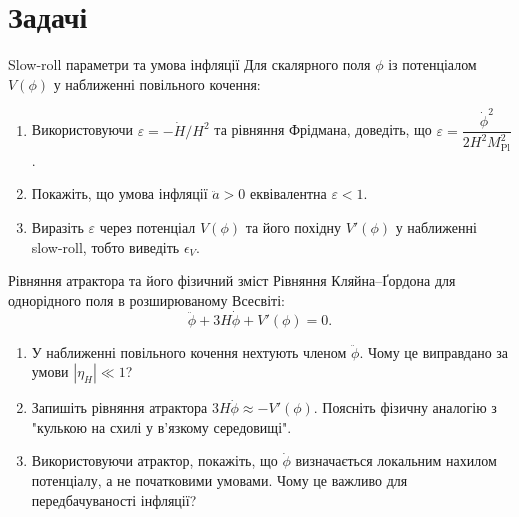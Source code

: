 \section*{Задачі}



\begin{problem}{Slow-roll параметри та умова інфляції}
Для скалярного поля $\phi$ із потенціалом $V(\phi)$ у наближенні повільного кочення:

\begin{enumerate}
    \item Використовуючи $\varepsilon = -\dot{H}/H^2$ та рівняння Фрідмана,
          доведіть, що $\varepsilon = \dfrac{\dot{\phi}^2}{2H^2 M_{\mathrm{Pl}}^2}$.
    \item Покажіть, що умова інфляції $\ddot{a} > 0$ еквівалентна $\varepsilon < 1$.
    \item Виразіть $\varepsilon$ через потенціал $V(\phi)$ та його похідну $V'(\phi)$
          у наближенні slow-roll, тобто виведіть $\epsilon_V$.
\end{enumerate}
\end{problem}


\begin{problem}{Рівняння атрактора та його фізичний зміст}
Рівняння Кляйна--Ґордона для однорідного поля в розширюваному Всесвіті:
\[
\ddot{\phi} + 3H\dot{\phi} + V'(\phi) = 0.
\]

\begin{enumerate}
    \item У наближенні повільного кочення нехтують членом $\ddot{\phi}$.
          Чому це виправдано за умови $|\eta_H| \ll 1$?
    \item Запишіть рівняння атрактора $3H\dot{\phi} \approx -V'(\phi)$.
          Поясніть фізичну аналогію з "кулькою на схилі у в'язкому середовищі".
    \item Використовуючи атрактор, покажіть, що $\dot{\phi}$ визначається локальним
          нахилом потенціалу, а не початковими умовами. Чому це важливо для
          передбачуваності інфляції?
\end{enumerate}
\end{problem}


